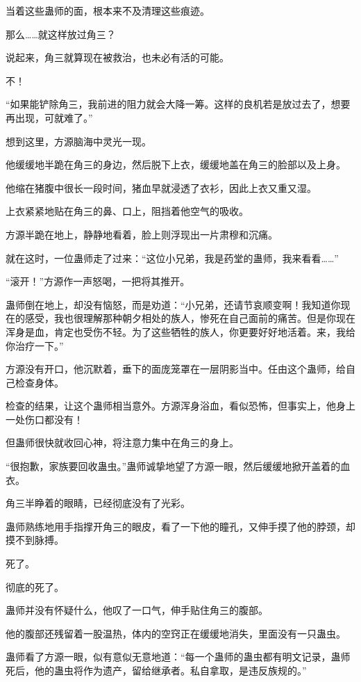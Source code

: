 \begin{this_body}
当着这些蛊师的面，根本来不及清理这些痕迹。

那么……就这样放过角三？

说起来，角三就算现在被救治，也未必有活的可能。

不！

“如果能铲除角三，我前进的阻力就会大降一筹。这样的良机若是放过去了，想要再出现，可就难了。”

想到这里，方源脑海中灵光一现。

他缓缓地半跪在角三的身边，然后脱下上衣，缓缓地盖在角三的脸部以及上身。

他缩在猪腹中很长一段时间，猪血早就浸透了衣衫，因此上衣又重又湿。

上衣紧紧地贴在角三的鼻、口上，阻挡着他空气的吸收。

方源半跪在地上，静静地看着，脸上则浮现出一片肃穆和沉痛。

就在这时，一位蛊师走了过来：“这位小兄弟，我是药堂的蛊师，我来看看……”

“滚开！”方源作一声怒喝，一把将其推开。

蛊师倒在地上，却没有恼怒，而是劝道：“小兄弟，还请节哀顺变啊！我知道你现在的感受，我也很理解那种朝夕相处的族人，惨死在自己面前的痛苦。但是你现在浑身是血，肯定也受伤不轻。为了这些牺牲的族人，你更要好好地活着。来，我给你治疗一下。”

方源没有开口，他沉默着，垂下的面庞笼罩在一层阴影当中。任由这个蛊师，给自己检查身体。

检查的结果，让这个蛊师相当意外。方源浑身浴血，看似恐怖，但事实上，他身上一处伤口都没有！

但蛊师很快就收回心神，将注意力集中在角三的身上。

“很抱歉，家族要回收蛊虫。”蛊师诚挚地望了方源一眼，然后缓缓地掀开盖着的血衣。

角三半睁着的眼睛，已经彻底没有了光彩。

蛊师熟练地用手指撑开角三的眼皮，看了一下他的瞳孔，又伸手摸了他的脖颈，却摸不到脉搏。

死了。

彻底的死了。

蛊师并没有怀疑什么，他叹了一口气，伸手贴住角三的腹部。

他的腹部还残留着一股温热，体内的空窍正在缓缓地消失，里面没有一只蛊虫。

蛊师看了方源一眼，似有意似无意地道：“每一个蛊师的蛊虫都有明文记录，蛊师死后，他的蛊虫将作为遗产，留给继承者。私自拿取，是违反族规的。”


\end{this_body}
